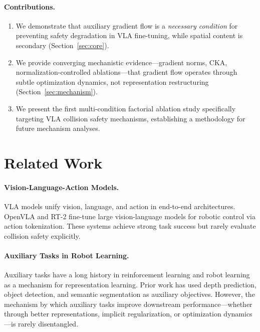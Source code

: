 \documentclass[10pt,letterpaper]{article}
\begin{document}
\paragraph{Contributions.}
\begin{enumerate}[nosep,leftmargin=1.5em]
  \item We demonstrate that auxiliary gradient flow is a \emph{necessary condition} for preventing safety degradation in VLA fine-tuning, while spatial content is secondary (Section~\ref{sec:core}).
  \item We provide converging mechanistic evidence---gradient norms, CKA, normalization-controlled ablations---that gradient flow operates through subtle optimization dynamics, not representation restructuring (Section~\ref{sec:mechanism}).
  \item We present the first multi-condition factorial ablation study specifically targeting VLA collision safety mechanisms, establishing a methodology for future mechanism analyses.
\end{enumerate}

\section{Related Work}
\label{sec:related}

\paragraph{Vision-Language-Action Models.}
VLA models unify vision, language, and action in end-to-end architectures. OpenVLA and RT-2 fine-tune large vision-language models for robotic control via action tokenization. These systems achieve strong task success but rarely evaluate collision safety explicitly.

\paragraph{Auxiliary Tasks in Robot Learning.}
Auxiliary tasks have a long history in reinforcement learning and robot learning as a mechanism for representation learning. Prior work has used depth prediction, object detection, and semantic segmentation as auxiliary objectives. However, the mechanism by which auxiliary tasks improve downstream performance---whether through better representations, implicit regularization, or optimization dynamics---is rarely disentangled.
\end{document}
